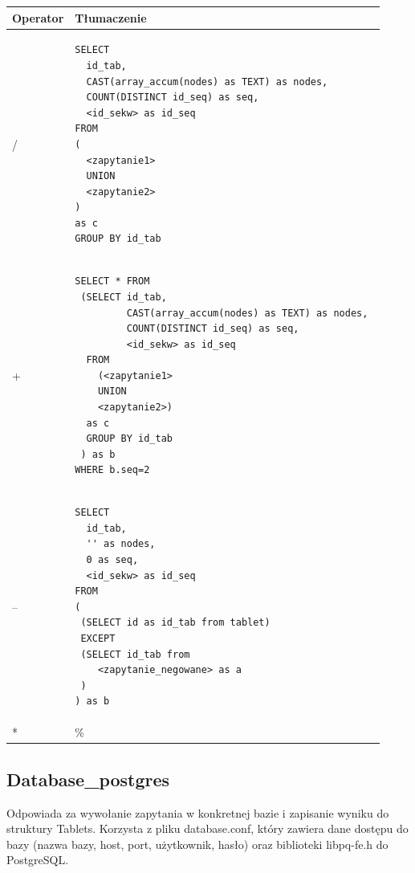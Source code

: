 \begin{longtable}{|p{1in}|p{4.5in}|}
\hline
{\bf Operator} & {\bf Tłumaczenie}\\
\hline
\endhead
/ & 
\begin{verbatim}
SELECT 
  id_tab, 
  CAST(array_accum(nodes) as TEXT) as nodes, 
  COUNT(DISTINCT id_seq) as seq,
  <id_sekw> as id_seq
FROM 
(
  <zapytanie1>
  UNION
  <zapytanie2>
)
as c
GROUP BY id_tab
\end{verbatim}
\\ 
\hline
+ &
\begin{verbatim}
SELECT * FROM
 (SELECT id_tab, 
         CAST(array_accum(nodes) as TEXT) as nodes, 
         COUNT(DISTINCT id_seq) as seq, 
         <id_sekw> as id_seq
  FROM
    (<zapytanie1>
    UNION
    <zapytanie2>)
  as c 
  GROUP BY id_tab
 ) as b
WHERE b.seq=2 
\end{verbatim}
\\ 
\hline
-- & 
\begin{verbatim}
SELECT 
  id_tab, 
  '' as nodes, 
  0 as seq,
  <id_sekw> as id_seq
FROM
(
 (SELECT id as id_tab from tablet)
 EXCEPT
 (SELECT id_tab from
    <zapytanie_negowane> as a
 )   
) as b
\end{verbatim}
\\ 
\hline
* & \%  \\ 
\hline
\end{longtable}


\subsection{Database\_postgres}

Odpowiada za wywołanie zapytania w konkretnej bazie i zapisanie wyniku do struktury Tablets.
 Korzysta z pliku database.conf, który zawiera dane dostępu do bazy (nazwa bazy, host, port, użytkownik, hasło)
oraz biblioteki libpq-fe.h do PostgreSQL.
